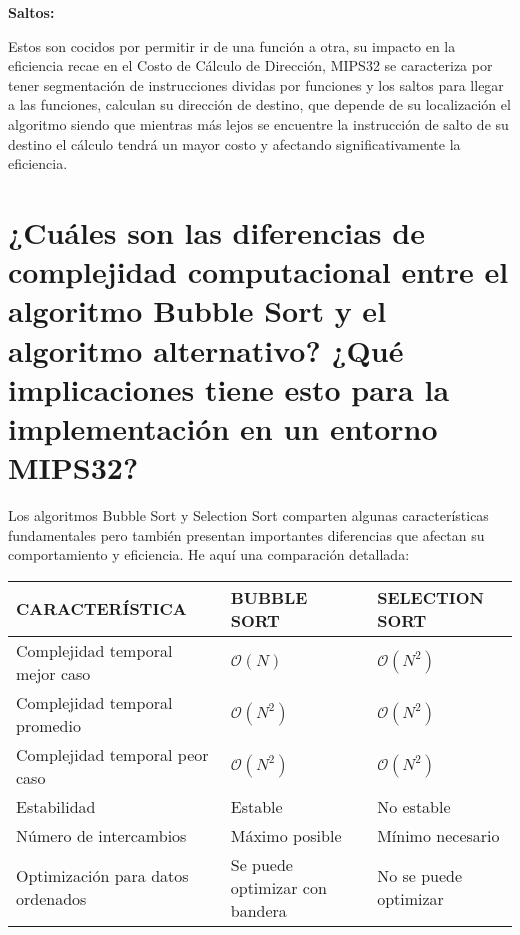 \documentclass{article}
\begin{document}
\quad

\textbf{Saltos: }

\quad

{Estos son cocidos por permitir ir de una función a otra, su impacto en la eficiencia recae en el Costo de Cálculo de Dirección, MIPS32 se caracteriza por tener segmentación de instrucciones dividas por funciones y los saltos para llegar a las funciones, calculan su dirección de destino, que depende de su localización el algoritmo siendo que mientras más lejos se encuentre la instrucción de salto de su destino el cálculo tendrá un mayor costo y afectando significativamente la eficiencia.}

\quad
\newpage









\section{¿Cuáles son las diferencias de complejidad computacional entre el algoritmo Bubble Sort y el algoritmo alternativo? ¿Qué implicaciones tiene esto para la implementación en un entorno MIPS32?}

\quad

{Los algoritmos Bubble Sort y Selection Sort comparten algunas características fundamentales pero también presentan importantes diferencias que afectan su comportamiento y eficiencia. He aquí una comparación detallada:}

\quad

\begin{tabular}{| p{4cm} |p{4cm} | p{4cm} |}
    \hline
    CARACTERÍSTICA & BUBBLE SORT & SELECTION SORT \\
    \hline
    Complejidad temporal mejor caso & $\mathcal{O}(N)$ & $\mathcal{O}(N^2)$
\\
    \hline
    Complejidad temporal promedio & $\mathcal{O}(N^2)$ & $\mathcal{O}(N^2)$ \\
    \hline
    Complejidad temporal peor caso & $\mathcal{O}(N^2)$ & $\mathcal{O}(N^2)$ \\
    \hline
    Estabilidad & Estable & No estable \\
    \hline
    Número de intercambios & Máximo posible & Mínimo necesario \\
    \hline
    Optimización para datos ordenados & Se puede optimizar con bandera & No se puede optimizar
 \\
    \hline

\end{tabular}\vspace{0.8cm}
\end{document}

